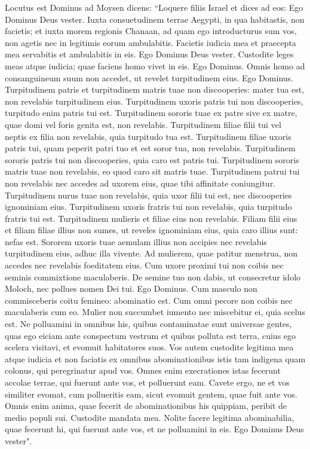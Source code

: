 \begin{biblechapter}  
\verse Locutus est Dominus ad Moysen dicens: 
\verse “Loquere filiis Israel et dices ad eos: Ego Dominus Deus vester. 
\verse Iuxta consuetudinem terrae Aegypti, in qua habitastis, non facietis; et iuxta morem regionis Chanaan, ad quam ego introducturus sum vos, non agetis nec in legitimis eorum ambulabitis. 
\verse Facietis iudicia mea et praecepta mea servabitis et ambulabitis in eis. Ego Dominus Deus vester. 
\verse Custodite leges meas atque iudicia; quae faciens homo vivet in eis. Ego Dominus. 
\verse Omnis homo ad consanguineum suum non accedet, ut revelet turpitudinem eius. Ego Dominus. 
\verse Turpitudinem patris et turpitudinem matris tuae non discooperies: mater tua est, non revelabis turpitudinem eius. 
\verse Turpitudinem uxoris patris tui non discooperies, turpitudo enim patris tui est. 
\verse Turpitudinem sororis tuae ex patre sive ex matre, quae domi vel foris genita est, non revelabis. 
\verse Turpitudinem filiae filii tui vel neptis ex filia non revelabis, quia turpitudo tua est. 
\verse Turpitudinem filiae uxoris patris tui, quam peperit patri tuo et est soror tua, non revelabis. 
\verse Turpitudinem sororis patris tui non discooperies, quia caro est patris tui. 
\verse Turpitudinem sororis matris tuae non revelabis, eo quod caro sit matris tuae. 
\verse Turpitudinem patrui tui non revelabis nec accedes ad uxorem eius, quae tibi affinitate coniungitur. 
\verse Turpitudinem nurus tuae non revelabis, quia uxor filii tui est, nec discooperies ignominiam eius. 
\verse Turpitudinem uxoris fratris tui non revelabis, quia turpitudo fratris tui est. 
\verse Turpitudinem mulieris et filiae eius non revelabis. Filiam filii eius et filiam filiae illius non sumes, ut reveles ignominiam eius, quia caro illius sunt: nefas est. 
\verse Sororem uxoris tuae aemulam illius non accipies nec revelabis turpitudinem eius, adhuc illa vivente. 
\verse Ad mulierem, quae patitur menstrua, non accedes nec revelabis foeditatem eius. 
\verse Cum uxore proximi tui non coibis nec seminis commixtione maculaberis. 
\verse De semine tuo non dabis, ut consecretur idolo Moloch, nec pollues nomen Dei tui. Ego Dominus. 
\verse Cum masculo non commisceberis coitu femineo: abominatio est. 
\verse Cum omni pecore non coibis nec maculaberis cum eo. Mulier non succumbet iumento nec miscebitur ei, quia scelus est. 
\verse Ne polluamini in omnibus his, quibus contaminatae sunt universae gentes, quas ego eiciam ante conspectum vestrum 
\verse et quibus polluta est terra, cuius ego scelera visitavi, et evomuit habitatores suos. 
\verse Vos autem custodite legitima mea atque iudicia et non faciatis ex omnibus abominationibus istis tam indigena quam colonus, qui peregrinatur apud vos. 
\verse Omnes enim execrationes istas fecerunt accolae terrae, qui fuerunt ante vos, et polluerunt eam. 
\verse Cavete ergo, ne et vos similiter evomat, cum pollueritis eam, sicut evomuit gentem, quae fuit ante vos. 
\verse Omnis enim anima, quae fecerit de abominationibus his quippiam, peribit de medio populi sui. 
\verse Custodite mandata mea. Nolite facere legitima abominabilia, quae fecerunt hi, qui fuerunt ante vos, et ne polluamini in eis. Ego Dominus Deus vester". 
\end{biblechapter}

